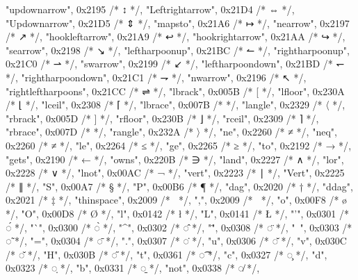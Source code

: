 	{"updownarrow", 0x2195 /* ↕ */},
	{"Leftrightarrow", 0x21D4 /* ⇔ */},
	{"Updownarrow", 0x21D5 /* ⇕ */},
	{"mapsto", 0x21A6 /* ↦ */},
	{"nearrow", 0x2197 /* ↗ */},
	{"hookleftarrow", 0x21A9 /* ↩ */},
	{"hookrightarrow", 0x21AA /* ↪ */},
	{"searrow", 0x2198 /* ↘ */},
	{"leftharpoonup", 0x21BC /* ↼ */},
	{"rightharpoonup", 0x21C0 /* ⇀ */},
	{"swarrow", 0x2199 /* ↙ */},
	{"leftharpoondown", 0x21BD /* ↽ */},
	{"rightharpoondown", 0x21C1 /* ⇁ */},
	{"nwarrow", 0x2196 /* ↖ */},
	{"rightleftharpoons", 0x21CC /* ⇌ */},
	{"lbrack", 0x005B /* [ */},
	{"lfloor", 0x230A /* ⌊ */},
	{"lceil", 0x2308 /* ⌈ */},
	{"lbrace", 0x007B /* { */},
	{"langle", 0x2329 /* 〈 */},
	{"rbrack", 0x005D /* ] */},
	{"rfloor", 0x230B /* ⌋ */},
	{"rceil", 0x2309 /* ⌉ */},
	{"rbrace", 0x007D /* } */},
	{"rangle", 0x232A /* 〉 */},
	{"ne", 0x2260 /* ≠ */},
	{"neq", 0x2260 /* ≠ */},
	{"le", 0x2264 /* ≤ */},
	{"ge", 0x2265 /* ≥ */},
	{"to", 0x2192 /* → */},
	{"gets", 0x2190 /* ← */},
	{"owns", 0x220B /* ∋ */},
	{"land", 0x2227 /* ∧ */},
	{"lor", 0x2228 /* ∨ */},
	{"lnot", 0x00AC /* ¬ */},
	{"vert", 0x2223 /* ∣ */},
	{"Vert", 0x2225 /* ∥ */},
	{"S", 0x00A7 /* § */},
	{"P", 0x00B6 /* ¶ */},
	{"dag", 0x2020 /* † */},
	{"ddag", 0x2021 /* ‡ */},
	{"thinspace", 0x2009 /*   */},
	{",", 0x2009 /*   */},
	{"o", 0x00F8 /* ø */},
	{"O", 0x00D8 /* Ø */},
	{"l", 0x0142 /* ł */},
	{"L", 0x0141 /* Ł */},
	{"'", 0x0301 /* ◌́ */},
	{"`", 0x0300 /* ◌̀ */},
	{"^", 0x0302 /* ◌̂ */},
	{"\"", 0x0308 /* ◌̈ */},
	{"~", 0x0303 /* ◌̃ */},
	{"=", 0x0304 /* ◌̄ */},
	{".", 0x0307 /* ◌̇ */},
	{"u", 0x0306 /* ◌̆ */},
	{"v", 0x030C /* ◌̌ */},
	{"H", 0x030B /* ◌̋ */},
	{"t", 0x0361 /* ◌͡ */},
	{"c", 0x0327 /* ◌̧ */},
	{"d", 0x0323 /* ◌̣ */},
	{"b", 0x0331 /* ◌̱ */},
	{"not", 0x0338 /* ◌̸ */},
